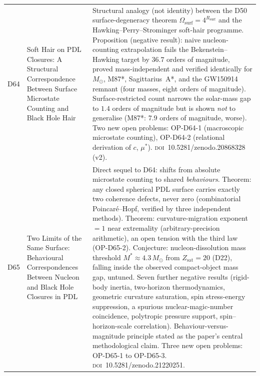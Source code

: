 \documentclass[11pt,a4paper]{article}
\theoremstyle{plain}
\theoremstyle{definition}
\theoremstyle{remark}
\newcommand{\Rsurf}{R_{\mathrm{surf}}}
\newcommand{\Zsat}{Z_{\mathrm{sat}}}
\begin{document}
\begin{longtable}{L{1.3cm}L{3.8cm}L{8.0cm}}
D64 & Soft Hair on PDL Closures: A Structural Correspondence Between Surface Microstate Counting and Black Hole Hair~\cite{D64} & Structural analogy (not identity) between the D50 surface-degeneracy theorem $\Omega_{\mathrm{surf}}=4^{\Rsurf}$ and the Hawking--Perry--Strominger soft-hair programme. \textcolor{proofblue}{Proposition (negative result)}: naive nucleon-counting extrapolation fails the Bekenstein--Hawking target by $36.7$ orders of magnitude, proved mass-independent and verified identically for $M_\odot$, M87*, Sagittarius~A*, and the GW150914 remnant (four masses, eight orders of magnitude). Surface-restricted count narrows the solar-mass gap to $1.4$ orders of magnitude but is shown \emph{not} to generalise (M87*: $7.9$ orders of magnitude, worse). Two new open problems: OP-D64-1 (macroscopic microstate counting), OP-D64-2 (relational derivation of $c$, $\mu^*$). \textsc{doi}~10.5281/zenodo.20868328 (v2).\\[0.4em]
D65 & Two Limits of the Same Surface: Behavioural Correspondences Between Nucleon and Black Hole Closures in PDL~\cite{D65} & Direct sequel to D64: shifts from absolute microstate counting to shared \emph{behaviours}. \textcolor{proofblue}{Theorem}: any closed spherical PDL surface carries exactly two coherence defects, never zero (combinatorial Poincar\'e--Hopf, verified by three independent methods). \textcolor{proofblue}{Theorem}: curvature-migration exponent $=1$ near extremality (arbitrary-precision arithmetic), an open tension with the third law (OP-D65-2). \textcolor{conjecturegreen}{Conjecture}: nucleon-dissolution mass threshold $M^*\approx4.3\,M_\odot$ from $\Zsat=20$ (D22), falling inside the observed compact-object mass gap, untuned. Seven further negative results (rigid-body inertia, two-horizon thermodynamics, geometric curvature saturation, spin stress-energy suppression, a spurious nuclear-magic-number coincidence, polytropic pressure support, spin--horizon-scale correlation). Behaviour-versus-magnitude principle stated as the paper's central methodological claim. Three new open problems: OP-D65-1 to OP-D65-3. \textsc{doi}~10.5281/zenodo.21220251.\\[0.4em]

\end{longtable}
\end{document}
